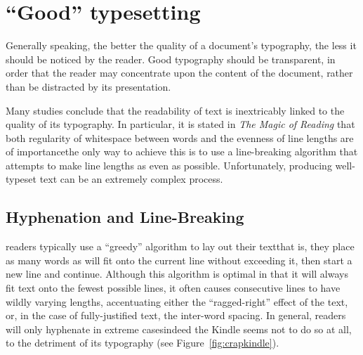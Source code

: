 \section{``Good'' typesetting}
\label{sec:goodtypesetting}

Generally speaking, the better the quality of a document's typography, the less it should be noticed by the reader. Good typography should be transparent, in order that the reader may concentrate upon the content of the document, rather than be distracted by its presentation.

Many studies\hspace{0pt}\cite{Mittelbach1992,Hill1999,Bringhurst2008,Voorhees2011,Legge2011} conclude that the readability of text is inextricably linked to the quality of its typography. In particular, it is stated in \emph{The Magic of Reading}\hspace{0pt}\cite{Hill1999} that both regularity of whitespace between words and the evenness of line lengths are of importance\ed the only way to achieve this is to use a line-breaking algorithm that attempts to make line lengths as even as possible. Unfortunately, producing well-typeset text can be an extremely complex process.\hspace{0pt}\cite{Hurst2009}


\subsection{Hyphenation and Line-Breaking}
\Ebook{} readers typically use a ``greedy'' algorithm to lay out their text\ed that is, they place as many words as will fit onto the current line without exceeding it, then start a new line and continue. Although this algorithm is optimal in that it will always fit text onto the fewest possible lines, it often causes consecutive lines to have wildly varying lengths, accentuating either the ``ragged-right'' effect of the text, or, in the case of fully-justified text, the inter-word spacing. In general, \ebook{} readers will only hyphenate in extreme cases\ed indeed the Kindle seems not to do so at all, to the detriment of its typography (see Figure~\ref{fig:crapkindle}).

